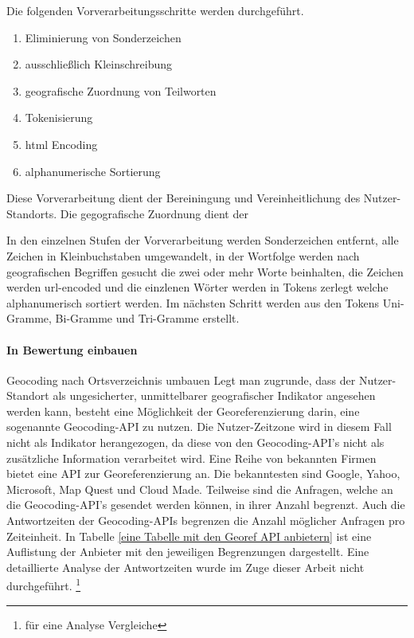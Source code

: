 Die folgenden Vorverarbeitungsschritte werden durchgeführt.

	\begin{enumerate}
		\item Eliminierung von Sonderzeichen
		\item ausschließlich Kleinschreibung
		\item geografische Zuordnung von Teilworten  	
		\item Tokenisierung
		\item html Encoding
		\item alphanumerische Sortierung 
	\end{enumerate}

	Diese Vorverarbeitung dient der Bereiningung und Vereinheitlichung des Nutzer-Standorts.  
	Die gegografische Zuordnung dient der  

	In den einzelnen Stufen der Vorverarbeitung werden Sonderzeichen entfernt, alle Zeichen in Kleinbuchstaben umgewandelt, in der Wortfolge werden nach geografischen Begriffen gesucht die zwei oder mehr Worte beinhalten, die Zeichen werden url-encoded und die einzlenen Wörter werden in Tokens zerlegt welche alphanumerisch sortiert werden.
	Im nächsten Schritt werden aus den Tokens Uni-Gramme, Bi-Gramme und Tri-Gramme erstellt. 



	\paragraph{In Bewertung einbauen} 
	Geocoding nach Ortsverzeichnis umbauen
	Legt man zugrunde, dass der Nutzer-Standort als ungesicherter, unmittelbarer geografischer Indikator angesehen werden kann, besteht eine Möglichkeit der Georeferenzierung darin, eine sogenannte Geocoding-API zu nutzen.
	Die Nutzer-Zeitzone wird in diesem Fall nicht als Indikator herangezogen, da diese von den Geocoding-API's nicht als zusätzliche Information verarbeitet wird. 
	Eine Reihe von bekannten Firmen bietet eine API zur Georeferenzierung an. 
	Die bekanntesten sind Google, Yahoo, Microsoft, Map Quest und Cloud Made. 
	Teilweise sind die Anfragen, welche an die Geocoding-API's gesendet werden können, in ihrer Anzahl begrenzt.
	Auch die Antwortzeiten der Geocoding-APIs begrenzen die Anzahl möglicher Anfragen pro Zeiteinheit. 
	In Tabelle \ref{eine Tabelle mit den Georef API anbietern} ist eine Auflistung der Anbieter mit den jeweiligen Begrenzungen dargestellt.
	Eine detaillierte Analyse der Antwortzeiten wurde im Zuge dieser Arbeit nicht durchgeführt.  \footnote{für eine Analyse Vergleiche} 


